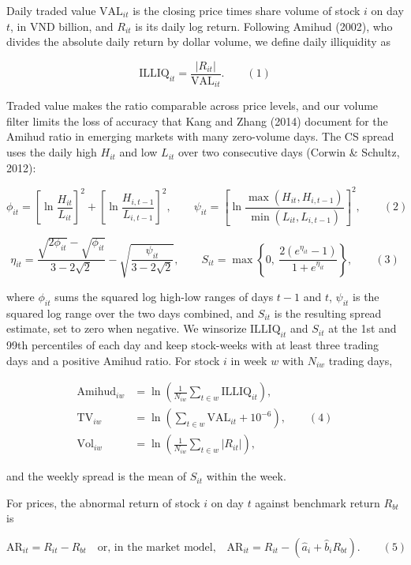 \documentclass[review,authoryear,12pt]{elsarticle}
\begin{document}
Daily traded value \(\mathrm{VAL}_{it}\) is the closing price times
share volume of stock \(i\) on day \(t\), in VND billion, and \(R_{it}\)
is its daily log return. Following Amihud (2002), who divides the
absolute daily return by dollar volume, we define daily illiquidity as

\[\mathrm{ILLIQ}_{it} = \frac{|R_{it}|}{\mathrm{VAL}_{it}}. \qquad (1)\]

Traded value makes the ratio comparable across price levels, and our
volume filter limits the loss of accuracy that Kang and Zhang (2014)
document for the Amihud ratio in emerging markets with many zero-volume
days. The CS spread uses the daily high \(H_{it}\) and low \(L_{it}\)
over two consecutive days (Corwin \& Schultz, 2012):

\[\phi_{it} = \left[\ln\frac{H_{it}}{L_{it}}\right]^2 + \left[\ln\frac{H_{i,t-1}}{L_{i,t-1}}\right]^2, \qquad \psi_{it} = \left[\ln\frac{\max(H_{it}, H_{i,t-1})}{\min(L_{it}, L_{i,t-1})}\right]^2, \qquad (2)\]

\[\eta_{it} = \frac{\sqrt{2\phi_{it}} - \sqrt{\phi_{it}}}{3 - 2\sqrt{2}} - \sqrt{\frac{\psi_{it}}{3 - 2\sqrt{2}}}, \qquad S_{it} = \max\left\{0,\ \frac{2\left(e^{\eta_{it}} - 1\right)}{1 + e^{\eta_{it}}}\right\}, \qquad (3)\]

where \(\phi_{it}\) sums the squared log high-low ranges of days \(t-1\)
and \(t\), \(\psi_{it}\) is the squared log range over the two days
combined, and \(S_{it}\) is the resulting spread estimate, set to zero
when negative. We winsorize \(\mathrm{ILLIQ}_{it}\) and \(S_{it}\) at
the 1st and 99th percentiles of each day and keep stock-weeks with at
least three trading days and a positive Amihud ratio. For stock \(i\) in
week \(w\) with \(N_{iw}\) trading days,

\[\begin{aligned} \mathrm{Amihud}_{iw} &= \ln\left(\frac{1}{N_{iw}}\sum_{t \in w}\mathrm{ILLIQ}_{it}\right), \\ \mathrm{TV}_{iw} &= \ln\left(\sum_{t \in w}\mathrm{VAL}_{it} + 10^{-6}\right), \qquad (4) \\ \mathrm{Vol}_{iw} &= \ln\left(\frac{1}{N_{iw}}\sum_{t \in w}|R_{it}|\right), \end{aligned}\]

and the weekly spread is the mean of \(S_{it}\) within the week.

For prices, the abnormal return of stock \(i\) on day \(t\) against
benchmark return \(R_{bt}\) is

\[\mathrm{AR}_{it} = R_{it} - R_{bt} \quad \text{or, in the market model,} \quad \mathrm{AR}_{it} = R_{it} - \left(\hat a_i + \hat b_i R_{bt}\right). \qquad (5)\]
\end{document}
